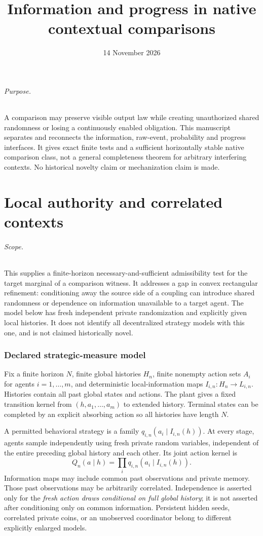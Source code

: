 \documentclass[11pt]{article}
\title{Information and progress in native contextual comparisons}
\author{}\date{14 November 2026}
\begin{document}
\maketitle
\paragraph{Purpose.} A comparison may preserve visible output law while creating unauthorized shared randomness or losing a continuously enabled obligation. This manuscript separates and reconnects the information, raw-event, probability and progress interfaces. It gives exact finite tests and a sufficient horizontally stable native comparison class, not a general completeness theorem for arbitrary interfering contexts. No historical novelty claim or mechanization claim is made.
\part{Local authority and correlated contexts}

\paragraph{Scope.}
This supplies a finite-horizon necessary-and-sufficient admissibility test for the target marginal of a comparison witness. It addresses a gap in convex rectangular refinement: conditioning away the source side of a coupling can introduce shared randomness or dependence on information unavailable to a target agent. The model below has fresh independent private randomization and explicitly given local histories. It does not identify all decentralized strategy models with this one, and is not claimed historically novel.

\section{Declared strategic-measure model}
Fix a finite horizon $N$, finite global histories $H_n$, finite nonempty action sets $A_i$ for agents $i=1,\ldots,m$, and deterministic local-information maps $I_{i,n}:H_n\to L_{i,n}$. Histories contain all past global states and actions. The plant gives a fixed transition kernel from $(h,a_1,\ldots,a_m)$ to extended history. Terminal states can be completed by an explicit absorbing action so all histories have length $N$.

A permitted behavioral strategy is a family $q_{i,n}(a_i\mid I_{i,n}(h))$. At every stage, agents sample independently using fresh private random variables, independent of the entire preceding global history and each other. Its joint action kernel is
\[
 Q_n(a\mid h)=\prod_i q_{i,n}(a_i\mid I_{i,n}(h)).
\]
Information maps may include common past observations and private memory. Those past observations may be arbitrarily correlated. Independence is asserted only for the \emph{fresh action draws conditional on full global history}; it is not asserted after conditioning only on common information. Persistent hidden seeds, correlated private coins, or an unobserved coordinator belong to different explicitly enlarged models.
\end{document}
